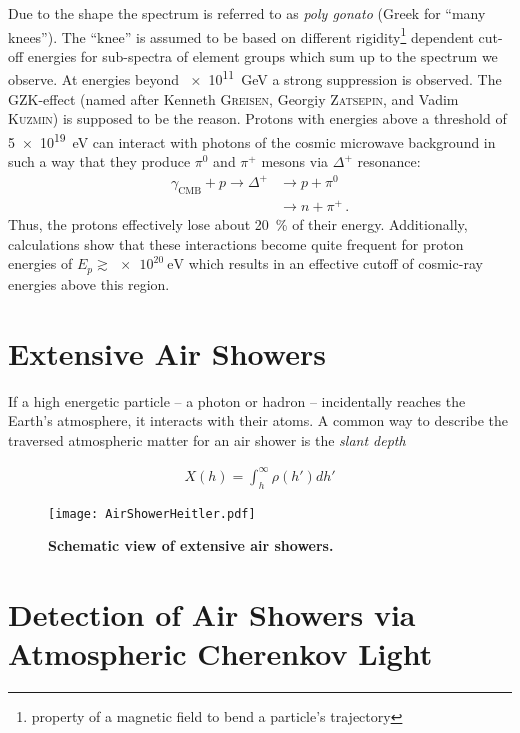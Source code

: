 Due to the shape the spectrum is referred to as \textit{poly gonato} (Greek for \enquote{many knees}). The \enquote{knee} is assumed to be based on different rigidity\footnote{property of a magnetic field to bend a particle's trajectory} dependent cut-off energies for sub-spectra of element groups which sum up to the spectrum we observe. \cite{cosmicrays:hoerandel, cosmicrays:shapiro} At energies beyond \SI{e11}{\giga\electronvolt} a strong suppression is observed. The GZK-effect (named after Kenneth \textsc{Greisen}, Georgiy \textsc{Zatsepin}, and Vadim \textsc{Kuzmin}) is supposed to be the reason. Protons with energies above a threshold of \SI{5e19}{\electronvolt} can interact with photons of the cosmic microwave background in such a way that they produce $\pi^0$ and $\pi^+$ mesons via $\Delta^+$ resonance:
\begin{align}
\gamma_\text{CMB} + p \rightarrow \Delta^+ &\rightarrow p + \pi^0\\
&\rightarrow n + \pi^+\,.
\end{align}
Thus, the protons effectively lose about \SI{20}{\percent} of their energy. Additionally, calculations show that these interactions become quite frequent for proton energies of $E_p\gtrsim\SI{e20}{\electronvolt}$ which results in an effective cutoff of cosmic-ray energies above this region. \cite{cosmicrays:gzk}

\section{Extensive Air Showers}

If a high energetic particle -- a photon or hadron -- incidentally reaches the Earth's atmosphere, it interacts with their atoms. A common way to describe the traversed atmospheric matter for an air shower is the \textit{slant depth}

\begin{align}
X(h) = \int_{h}^{\infty}\rho(h')dh'
\end{align}
 
\begin{figure}[h]
	\texttt{[image: AirShowerHeitler.pdf]}
	\caption[Schematic view of extensive air showers]{\textbf{Schematic view of extensive air showers. \cite{famous:niggemann}}}	
\end{figure}

\section{Detection of Air Showers via Atmospheric Cherenkov Light}\label{sec:cherenkov}

